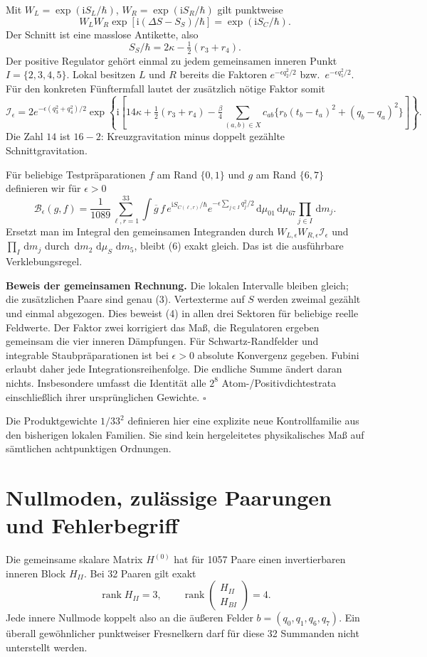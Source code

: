 \documentclass[10pt,a4paper]{article}
\newcommand{\dd}{\,\mathrm d}\newcommand{\ii}{\mathrm i}
\begin{document}
Mit $W_L=\exp(\ii S_L/\hbar)$, $W_R=\exp(\ii S_R/\hbar)$ gilt punktweise
\[
 W_LW_R\exp[\ii(\Delta S-S_S)/\hbar]=\exp(\ii S_C/\hbar).
                                                               \tag{4}
\]
Der Schnitt ist eine masslose Antikette, also
\[
 S_S/\hbar=2\kappa-\tfrac12(r_3+r_4).
\]
Der positive Regulator gehört einmal zu jedem gemeinsamen inneren Punkt
$I=\{2,3,4,5\}$. Lokal besitzen $L$ und $R$ bereits die Faktoren
$e^{-\epsilon q_2^2/2}$ bzw.\ $e^{-\epsilon q_5^2/2}$.
Für den konkreten Fünftermfall lautet der zusätzlich nötige Faktor somit
\[
 \mathcal I_\epsilon
 =2e^{-\epsilon(q_3^2+q_4^2)/2}
 \exp\!\left\{\ii\left[
 14\kappa+\tfrac12(r_3+r_4)
 -\tfrac\beta4\sum_{(a,b)\in X}c_{ab}
 \{r_b(t_b-t_a)^2+(q_b-q_a)^2\}\right]\right\}.                \tag{5}
\]
Die Zahl $14$ ist $16-2$: Kreuzgravitation minus doppelt gezählte Schnittgravitation.

Für beliebige Testpräparationen $f$ am Rand $\{0,1\}$ und $g$ am Rand
$\{6,7\}$ definieren wir für $\epsilon>0$
\[
 \mathcal B_\epsilon(g,f)=
 \frac1{1089}\sum_{\ell,r=1}^{33}
 \int \overline{g}\,f\,e^{\ii S_{C(\ell,r)}/\hbar}
 e^{-\epsilon\sum_{j\in I}q_j^2/2}
 \dd\mu_{01}\dd\mu_{67}\prod_{j\in I}\dd m_j.                 \tag{6}
\]
Ersetzt man im Integral den gemeinsamen Integranden durch
$W_{L,\epsilon}W_{R,\epsilon}\mathcal I_\epsilon$ und
$\prod_{I}\dd m_j$ durch $\dd m_2\,\dd\mu_S\,\dd m_5$,
bleibt (6) exakt gleich. Das ist die ausführbare Verklebungsregel.

\textbf{Beweis der gemeinsamen Rechnung.}
Die lokalen Intervalle bleiben gleich; die zusätzlichen Paare sind genau (3).
Vertexterme auf $S$ werden zweimal gezählt und einmal abgezogen.
Dies beweist (4) in allen drei Sektoren für beliebige reelle Feldwerte.
Der Faktor zwei korrigiert das Maß, die Regulatoren ergeben gemeinsam
die vier inneren Dämpfungen. Für Schwartz-Randfelder und integrable
Staubpräparationen ist bei $\epsilon>0$ absolute Konvergenz gegeben.
Fubini erlaubt daher jede Integrationsreihenfolge. Die endliche Summe
ändert daran nichts. Insbesondere umfasst die Identität alle $2^8$
Atom-/Positivdichtestrata einschließlich ihrer ursprünglichen Gewichte.
\hfill$\square$

Die Produktgewichte $1/33^2$ definieren hier eine explizite neue
Kontrollfamilie aus den bisherigen lokalen Familien. Sie sind kein
hergeleitetes physikalisches Maß auf sämtlichen achtpunktigen Ordnungen.
\newpage

\section{Nullmoden, zulässige Paarungen und Fehlerbegriff}
Die gemeinsame skalare Matrix $H^{(0)}$ hat für 1057 Paare einen invertierbaren
inneren Block $H_{II}$. Bei 32 Paaren gilt exakt
\[
 \operatorname{rank}H_{II}=3,\qquad
 \operatorname{rank}\begin{pmatrix}H_{II}\\H_{BI}\end{pmatrix}=4.
                                                               \tag{7}
\]
Jede innere Nullmode koppelt also an die äußeren Felder
$b=(q_0,q_1,q_6,q_7)$. Ein überall gewöhnlicher punktweiser Fresnelkern
darf für diese 32 Summanden nicht unterstellt werden.
\end{document}
